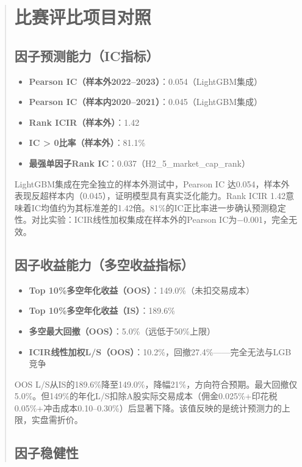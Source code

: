 \documentclass[12pt,a4paper]{article}
\begin{document}
\begin{abstract}
\section{比赛评比项目对照}

\subsection{因子预测能力（IC指标）}

\begin{itemize}
    \item \textbf{Pearson IC（样本外2022--2023）}：0.054（LightGBM集成）
    \item \textbf{Pearson IC（样本内2020--2021）}：0.045（LightGBM集成）
    \item \textbf{Rank ICIR（样本外）}：1.42
    \item \textbf{IC > 0比率（样本外）}：81.1\%
    \item \textbf{最强单因子Rank IC}：0.037（H2\_5\_market\_cap\_rank）
\end{itemize}

LightGBM集成在完全独立的样本外测试中，Pearson IC 达0.054，样本外表现反超样本内（0.045），证明模型具有真实泛化能力。Rank ICIR 1.42意味着IC均值约为其标准差的1.42倍。81\%的IC正比率进一步确认预测稳定性。对比实验：ICIR线性加权集成在样本外的Pearson IC为$-$0.001，完全无效。

\subsection{因子收益能力（多空收益指标）}

\begin{itemize}
    \item \textbf{Top 10\%多空年化收益（OOS）}：149.0\%（未扣交易成本）
    \item \textbf{Top 10\%多空年化收益（IS）}：189.6\%
    \item \textbf{多空最大回撤（OOS）}：5.0\%（远低于50\%上限）
    \item \textbf{ICIR线性加权L/S（OOS）}：10.2\%，回撤27.4\%——完全无法与LGB竞争
\end{itemize}

OOS L/S从IS的189.6\%降至149.0\%，降幅21\%，方向符合预期。最大回撤仅5.0\%。但149\%的年化L/S扣除A股实际交易成本（佣金0.025\%+印花税0.05\%+冲击成本0.10--0.30\%）后显著下降。该值反映的是统计预测力的上限，实盘需折价。

\subsection{因子稳健性}


\end{abstract}
\end{document}
